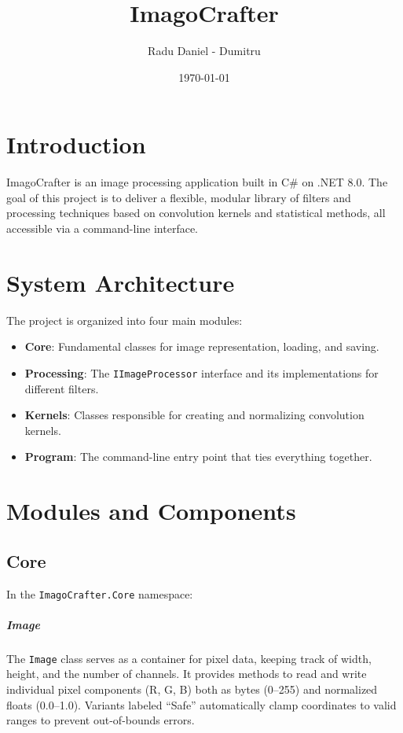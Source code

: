 \documentclass[12pt,a4paper]{report}
\title{ImagoCrafter}
\author{Radu Daniel - Dumitru}
\date{\today}
\begin{document}
\maketitle
\tableofcontents

\chapter{Introduction}
ImagoCrafter is an image processing application built in C\# on .NET 8.0. The goal of this project is to deliver a flexible, modular library of filters and processing techniques based on convolution kernels and statistical methods, all accessible via a command-line interface.

\chapter{System Architecture}
The project is organized into four main modules:
\begin{itemize}
  \item \textbf{Core}: Fundamental classes for image representation, loading, and saving.
  \item \textbf{Processing}: The \texttt{IImageProcessor} interface and its implementations for different filters.
  \item \textbf{Kernels}: Classes responsible for creating and normalizing convolution kernels.
  \item \textbf{Program}: The command-line entry point that ties everything together.
\end{itemize}

\chapter{Modules and Components}

\section{Core}
In the \texttt{ImagoCrafter.Core} namespace:

\paragraph{Image}
The \texttt{Image} class serves as a container for pixel data, keeping track of width, height, and the number of channels. It provides methods to read and write individual pixel components (R, G, B) both as bytes (0–255) and normalized floats (0.0–1.0). Variants labeled “Safe” automatically clamp coordinates to valid ranges to prevent out-of-bounds errors.
\end{document}
